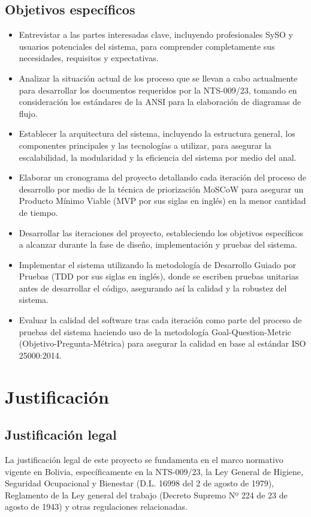 \subsection{Objetivos específicos}
\begin{itemize}
	\item Entrevistar a las partes interesadas clave, incluyendo profesionales SySO y usuarios potenciales del sistema, para comprender completamente sus necesidades, requisitos y expectativas.
	\item Analizar la situación actual de los proceso que se llevan a cabo actualmente para desarrollar los documentos requeridos por la NTS-009/23, tomando en consideración los estándares de la ANSI para la elaboración de diagramas de flujo.
	\item Establecer la arquitectura del sistema, incluyendo la estructura general, los componentes principales y las tecnologías a utilizar, para asegurar la escalabilidad, la modularidad y la eficiencia del sistema por medio del anal.
	\item Elaborar un cronograma del proyecto detallando cada iteración del proceso de desarrollo por medio de la técnica de priorización MoSCoW para asegurar un Producto Mínimo Viable (MVP por sus siglas en inglés) en la menor cantidad de tiempo.
	\item Desarrollar las iteraciones del proyecto, estableciendo los objetivos específicos a alcanzar durante la fase de diseño, implementación y pruebas del sistema.
	\item Implementar el sistema utilizando la metodología de Desarrollo Guiado por Pruebas (TDD por sus siglas en inglés), donde se escriben pruebas unitarias antes de desarrollar el código, asegurando así la calidad y la robustez del sistema.
	\item Evaluar la calidad del software tras cada iteración como parte del proceso de pruebas del sistema haciendo uso de la metodología Goal-Question-Metric (Objetivo-Pregunta-Métrica) para asegurar la calidad en base al estándar ISO 25000:2014.
\end{itemize}

\section{Justificación}
\subsection{Justificación legal}
La justificación legal de este proyecto se fundamenta en el marco normativo vigente en Bolivia, específicamente en la NTS-009/23, la Ley General de Higiene, Seguridad Ocupacional y Bienestar (D.L. 16998 del 2 de agosto de 1979), Reglamento de la Ley general del trabajo (Decreto Supremo Nº 224 de 23 de agosto de 1943) y otras regulaciones relacionadas.

